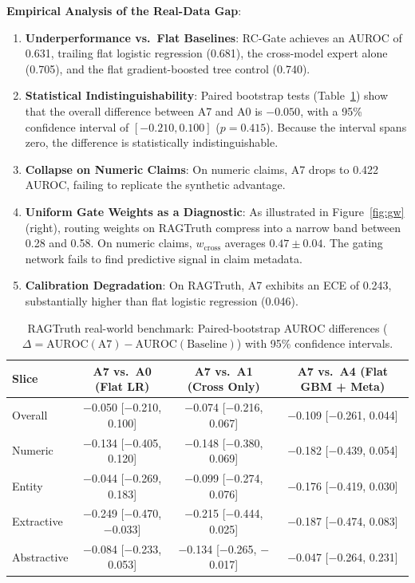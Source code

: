 \documentclass[pdflatex,sn-mathphys,Numbered]{sn-jnl}
\begin{document}
\noindent \textbf{Empirical Analysis of the Real-Data Gap}:
\begin{enumerate}
    \item \textbf{Underperformance vs.\ Flat Baselines}: RC-Gate achieves an AUROC of 0.631, trailing flat logistic regression (0.681), the cross-model expert alone (0.705), and the flat gradient-boosted tree control (0.740).
    \item \textbf{Statistical Indistinguishability}: Paired bootstrap tests (Table~\ref{tab:rag_paired}) show that the overall difference between A7 and A0 is $-0.050$, with a 95\% confidence interval of $[-0.210, 0.100]$ ($p = 0.415$). Because the interval spans zero, the difference is statistically indistinguishable.
    \item \textbf{Collapse on Numeric Claims}: On numeric claims, A7 drops to 0.422 AUROC, failing to replicate the synthetic advantage.
    \item \textbf{Uniform Gate Weights as a Diagnostic}: As illustrated in Figure~\ref{fig:gw} (right), routing weights on RAGTruth compress into a narrow band between 0.28 and 0.58. On numeric claims, $w_{\mathrm{cross}}$ averages $0.47 \pm 0.04$. The gating network fails to find predictive signal in claim metadata.
    \item \textbf{Calibration Degradation}: On RAGTruth, A7 exhibits an ECE of 0.243, substantially higher than flat logistic regression (0.046).
\end{enumerate}

\begin{table}[htbp]
\caption{RAGTruth real-world benchmark: Paired-bootstrap AUROC differences ($\Delta = \mathrm{AUROC}(\text{A7}) - \mathrm{AUROC}(\text{Baseline})$) with 95\% confidence intervals.}\label{tab:rag_paired}
\footnotesize
\setlength{\tabcolsep}{3.5pt}
\begin{tabular}{@{}lccc@{}}
\toprule
\textbf{Slice} & \textbf{A7 vs.\ A0 (Flat LR)} & \textbf{A7 vs.\ A1 (Cross Only)} & \textbf{A7 vs.\ A4 (Flat GBM + Meta)} \\
\midrule
Overall & $-$0.050 [$-$0.210, 0.100] & $-$0.074 [$-$0.216, 0.067] & $-$0.109 [$-$0.261, 0.044] \\
Numeric & $-$0.134 [$-$0.405, 0.120] & $-$0.148 [$-$0.380, 0.069] & $-$0.182 [$-$0.439, 0.054] \\
Entity & $-$0.044 [$-$0.269, 0.183] & $-$0.099 [$-$0.274, 0.076] & $-$0.176 [$-$0.419, 0.030] \\
Extractive & $-$0.249 [$-$0.470, $-$0.033] & $-$0.215 [$-$0.444, 0.025] & $-$0.187 [$-$0.474, 0.083] \\
Abstractive & $-$0.084 [$-$0.233, 0.053] & $-$0.134 [$-$0.265, $-$0.017] & $-$0.047 [$-$0.264, 0.231] \\
\bottomrule
\end{tabular}
\end{table}
\end{document}
